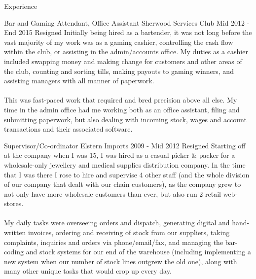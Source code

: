 \begin{tmrsection}{Experience}

\tmrdetailentry
	{Bar and Gaming Attendant, Office Assistant}
	{Sherwood Services Club}
	{Mid 2012 - End 2015}
	{Resigned}
	{Initially being hired as a bartender, it was not long before the vast majority of my work was as a gaming cashier, controlling the cash flow within the club, or assisting in the admin/accounts office. My duties as a cashier included swapping money and making change for customers and other areas of the club, counting and sorting tills, making payouts to gaming winners, and assisting managers with all manner of paperwork.\\\\This was fast-paced work that required and bred precision above all else. My time in the admin office had me working both as an office assistant, filing and submitting paperwork, but also dealing with incoming stock, wages and account transactions and their associated software.}
	
\tmrdetailentry
	{Supervisor/Co-ordinator}
	{Elstern Imports}
	{2009 - Mid 2012}
	{Resigned}
	{Starting off at the company when I was 15, I was hired as a casual picker \& packer for a wholesale-only jewellery and medical supplies distribution company. In the time that I was there I rose to hire and supervise 4 other staff (and the whole division of our company that dealt with our chain customers), as the company grew to not only have more wholesale customers than ever, but also run 2 retail web-stores.\\\\My daily tasks were overseeing orders and dispatch, generating digital and hand-written invoices, ordering and receiving of stock from our suppliers, taking complaints, inquiries and orders via phone/email/fax, and managing the bar-coding and stock systems for our end of the warehouse (including implementing a new system when our number of stock lines outgrew the old one), along with many other unique tasks that would crop up every day.}

\end{tmrsection}